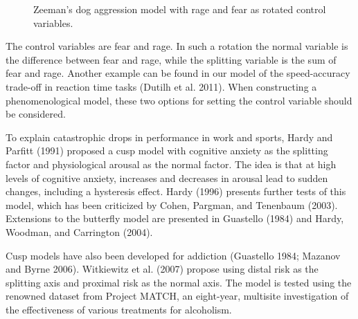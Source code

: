 \documentclass[
  a4paper,
  DIV=11,
  numbers=noendperiod,
  oneside]{scrreprt}
\begin{document}
\begin{figure}


\caption{\label{fig-ch3-img17-old-29}Zeeman's dog aggression model with
rage and fear as rotated control variables.}

\end{figure}%

The control variables are fear and rage. In such a rotation the normal
variable is the difference between fear and rage, while the splitting
variable is the sum of fear and rage. Another example can be found in
our model of the speed-accuracy trade-off in reaction time tasks (Dutilh
et al. 2011). When constructing a phenomenological model, these two
options for setting the control variable should be considered.

To explain catastrophic drops in performance in work and sports, Hardy
and Parfitt (1991) proposed a cusp model with cognitive anxiety as the
splitting factor and physiological arousal as the normal factor. The
idea is that at high levels of cognitive anxiety, increases and
decreases in arousal lead to sudden changes, including a hysteresis
effect. Hardy (1996) presents further tests of this model, which has
been criticized by Cohen, Pargman, and Tenenbaum (2003). Extensions to
the butterfly model are presented in Guastello (1984) and Hardy,
Woodman, and Carrington (2004).

Cusp models have also been developed for addiction (Guastello 1984;
Mazanov and Byrne 2006). Witkiewitz et al. (2007) propose using distal
risk as the splitting axis and proximal risk as the normal axis. The
model is tested using the renowned dataset from Project MATCH, an
eight-year, multisite investigation of the effectiveness of various
treatments for alcoholism.
\end{document}
